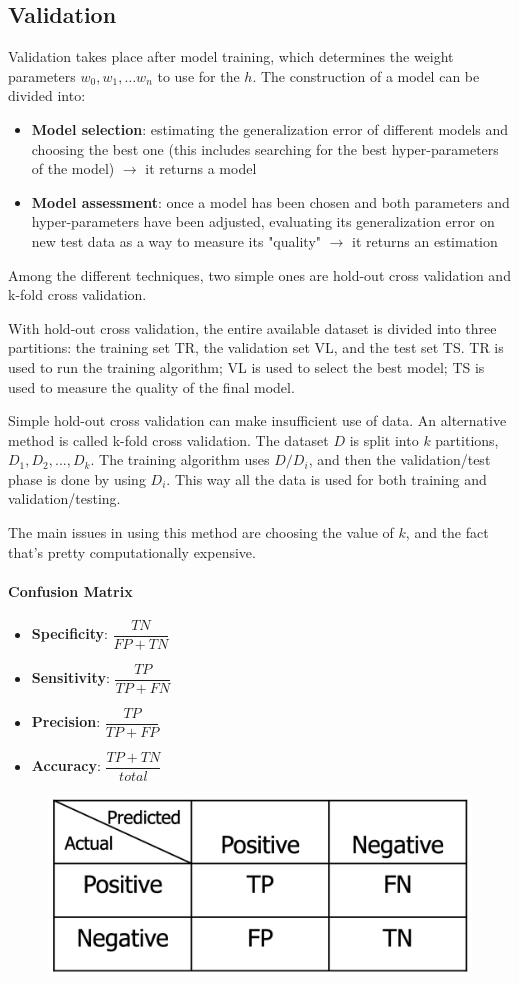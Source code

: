 \subsection{Validation}

Validation takes place after model training, which determines the weight parameters $w_0, w_1, \dots w_n$ to use for the $h$. The construction of a model can be divided into:

\begin{itemize}
    \item \textbf{Model selection}: estimating the generalization error of different models and choosing the best one (this includes searching for the best hyper-parameters of the model) $\xrightarrow{}$ it returns a model

    \item \textbf{Model assessment}: once a model has been chosen and both parameters and hyper-parameters have been adjusted, evaluating its generalization error on new test data as a way to measure its "quality" $\xrightarrow{}$ it returns an estimation
\end{itemize}

Among the different techniques, two simple ones are hold-out cross validation and k-fold cross validation.

With hold-out cross validation, the entire available dataset is divided into three partitions: the training set TR, the validation set VL, and the test set TS. TR is used to run the training algorithm; VL is used to select the best model; TS is used to measure the quality of the final model.

Simple hold-out cross validation can make insufficient use of data. An alternative method is called k-fold cross validation. The dataset $D$ is split into $k$ partitions, $D_1, D_2, ..., D_k$. The training algorithm uses $D/D_i$, and then the validation/test phase is done by using $D_i$. This way all the data is used for both training and validation/testing.

The main issues in using this method are choosing the value of $k$, and the fact that's pretty computationally expensive.

\paragraph{Confusion Matrix}

\begin{itemize}
    \item \textbf{Specificity}: $\dfrac{TN}{FP + TN}$

    \item \textbf{Sensitivity}: $\dfrac{TP}{TP + FN}$

    \item \textbf{Precision}: $\dfrac{TP}{TP + FP}$

    \item \textbf{Accuracy}: $\dfrac{TP + TN}{total}$
\end{itemize}

\begin{figure}[h]
    \centering
    \includegraphics[width=0.5\linewidth]{img/Screenshot 2023-10-04 alle 21.11.26.png}
\end{figure}

